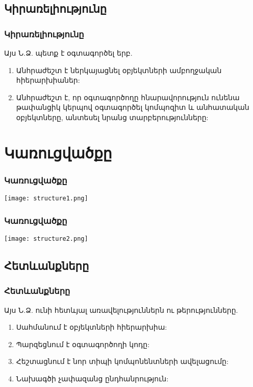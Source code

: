 \documentclass{beamer}
\begin{document}
\subsection{Կիրառելիությունը}
\begin{frame}\frametitle{Կիրառելիությունը}
Այս Ն.Ձ. պետք է օգտագործել երբ.
\vfill
\begin{enumerate}
    \item Անհրաժեշտ է ներկայացնել օբյեկտների ամբողջական հիերարխիաներ: \pause \vfill
    \item Անհրաժեշտ է, որ օգտագործողը հնարավորություն ունենա թափանցիկ կերպով
    օգտագործել կոմպոզիտ և անհատական օբյեկտները, անտեսել նրանց տարբերությունները:
\end{enumerate}
\end{frame}

\section{Կառուցվածքը}
\begin{frame}\frametitle{Կառուցվածքը}
\begin{center}
    \texttt{[image: structure1.png]}
\end{center}
\end{frame}

\begin{frame}\frametitle{Կառուցվածքը}
\begin{center}
    \texttt{[image: structure2.png]}
\end{center}
\end{frame}

\subsection{Հետևանքները}
\begin{frame}\frametitle{Հետևանքները}
Այս Ն.Ձ. ունի հետևյալ առավելություններն ու թերությունները.
\vfill
\begin{enumerate}
    \item Սահմանում է օբյեկտների հիերարխիա: \pause \vfill
    \item Պարզեցնում է օգտագործողի կոդը: \pause \vfill
    \item Հեշտացնում է նոր տիպի կոմպոնենտների ավելացումը: \pause \vfill
    \item Նախագծի չափազանց ընդհանրություն:
\end{enumerate}
\end{frame}
\end{document}
